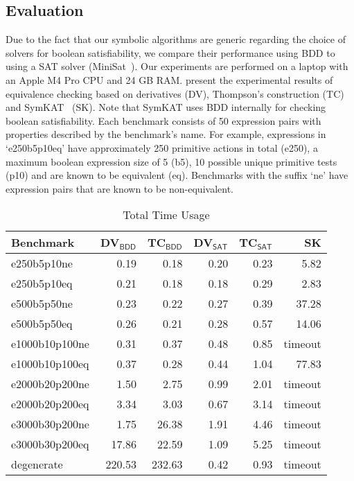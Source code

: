 \documentclass[conference]{IEEEtran}
\begin{document}
\subsection{Evaluation}\label{sec:performance-implementation}
Due to the fact that our symbolic algorithms are generic regarding the choice of solvers for boolean satisfiability, we compare their performance using BDD to using a SAT solver (MiniSat~\cite{een_MINISAT_2004}). Our experiments are performed on a laptop with an Apple M4 Pro CPU and 24 GB RAM.  present the experimental results of equivalence checking based on derivatives (DV), Thompson's construction (TC) and SymKAT~\cite{pous_SymbolicAlgorithmsLanguage_2015} (SK). Note that SymKAT uses BDD internally for checking boolean satisfiability. Each benchmark consists of 50 expression pairs with properties described by the benchmark's name. For example, expressions in `e250b5p10eq' have approximately 250 primitive actions in total (e250), a maximum boolean expression size of 5 (b5), 10 possible unique primitive tests (p10) and are known to be equivalent (eq). Benchmarks with the suffix `ne' have expression pairs that are known to be non-equivalent. 

\begin{table}[H]
\footnotesize
\centering
\setlength{\tabcolsep}{3pt}
\begin{tabular}{l r r r r r}
    Benchmark & DV$_{\textsf{BDD}}$ & TC$_{\textsf{BDD}}$ & DV$_{\textsf{SAT}}$ & TC$_{\textsf{SAT}}$ & SK \\
    \hline
    e250b5p10ne    &   0.19 &   0.18 & 0.20 & 0.23 &    5.82 \\
    e250b5p10eq    &   0.21 &   0.18 & 0.18 & 0.29 &    2.83 \\
    e500b5p50ne    &   0.23 &   0.22 & 0.27 & 0.39 &   37.28 \\
    e500b5p50eq    &   0.26 &   0.21 & 0.28 & 0.57 &   14.06 \\
    e1000b10p100ne &   0.31 &   0.37 & 0.48 & 0.85 & timeout \\
    e1000b10p100eq &   0.37 &   0.28 & 0.44 & 1.04 &   77.83 \\
    e2000b20p200ne &   1.50 &   2.75 & 0.99 & 2.01 & timeout \\
    e2000b20p200eq &   3.34 &   3.03 & 0.67 & 3.14 & timeout \\
    e3000b30p200ne &   1.75 &  26.38 & 1.91 & 4.46 & timeout \\
    e3000b30p200eq &  17.86 &  22.59 & 1.09 & 5.25 & timeout \\
    degenerate     & 220.53 & 232.63 & 0.42 & 0.93 & timeout
\end{tabular}
\caption{Total Time Usage}\label{tab:benchmark-time}
\end{table}
\end{document}
